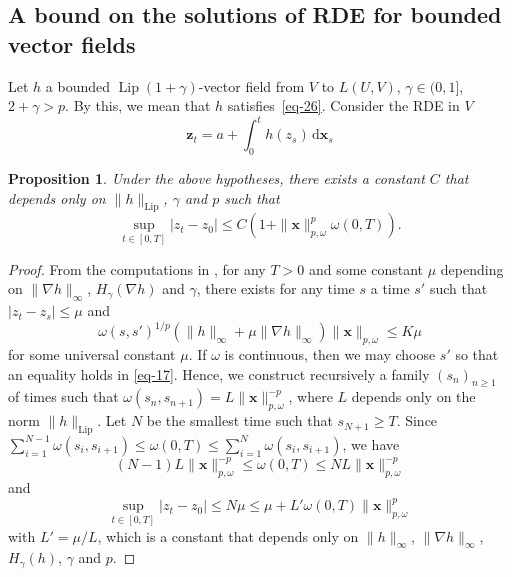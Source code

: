 \documentclass[a4paper,12pt]{article}
\newtheorem{proposition}[theorem]{Proposition}
\theoremstyle{definition}
\newcommand{\vd}{\,\mathrm{d}}
\newcommand{\bx}{\mathbf{x}}
\newcommand{\bz}{\mathbf{z}}
\DeclareMathOperator{\Lip}{Lip}
\begin{document}
\subsection{A bound on the solutions of RDE  for bounded vector fields}

Let $h$ a bounded $\Lip(1+\gamma)$-vector field from $V$ to $L(U,V)$, 
$\gamma\in(0,1]$, $2+\gamma>p$.
By this, we mean that $h$ satisfies~\eqref{eq-26}.
Consider the RDE in $V$
\begin{equation}
\label{eq-19}
\bz_t=a+\int_0^t h(z_s)\vd \bx_s
\end{equation}

\begin{proposition}
\label{prop-3}
Under the above hypotheses, 
there exists a constant $C$ that depends only on $\|h\|_{\Lip}$, 
$\gamma$ and $p$ such that 
\begin{equation}
\label{eq-18}
\sup_{t\in[0,T]}|z_t-z_0|\leq C(1+\|\bx\|_{p,\omega}^p\omega(0,T)).
\end{equation}
\end{proposition}

\begin{proof}
From the computations in \cite{lejay09a}, for any $T>0$
and some constant $\mu$ depending on $\|\nabla h\|_{\infty}$,
$H_\gamma(\nabla h)$ and $\gamma$,
there exists for any time $s$ a time $s'$ such that 
$|z_t-z_s|\leq \mu$ and 
\begin{equation}
\label{eq-17}
\omega(s,s')^{1/p}(\|h\|_{\infty}
+\mu\|\nabla h\|_{\infty})\|\bx\|_{p,\omega}\leq K\mu
\end{equation}
for some universal constant $\mu$. If $\omega$ is continuous, 
then we may choose $s'$ so that an equality holds in \eqref{eq-17}. 
Hence, we construct recursively a family $(s_n)_{n\geq 1}$ of times 
such that $\omega(s_{n},s_{n+1})=L\|\bx\|_{p,\omega}^{-p}$, 
where $L$ depends only on the norm $\|h\|_{\Lip}$. 
Let $N$ be the smallest time such that $s_{N+1}\geq T$.
Since $\sum_{i=1}^{N-1} \omega(s_i,s_{i+1})\leq \omega(0,T)\leq
\sum_{i=1}^{N} \omega(s_i,s_{i+1})$, we have 
\begin{equation*}
(N-1) L\|\bx\|^{-p}_{p,\omega}\leq \omega(0,T)
\leq N L\|\bx\|^{-p}_{p,\omega}
\end{equation*}
and 
\begin{equation}
\sup_{t\in[0,T]}|z_t-z_0|\leq N\mu \leq \mu+L'\omega(0,T)\|\bx\|_{p,\omega}^p
\end{equation}
with $L'=\mu/L$, which is a constant that depends only on 
 $\|h\|_{\infty}$, $\|\nabla h\|_{\infty}$, $H_\gamma(h)$,
 $\gamma$ and $p$.
\end{proof}
\end{document}
